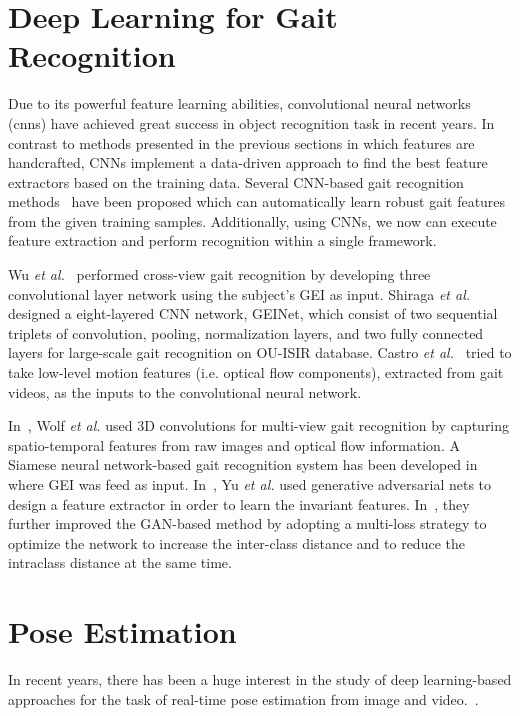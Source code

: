 \section{Deep Learning for Gait Recognition} \label{sec:deep_learning_gait_rec}
Due to its powerful feature learning abilities, convolutional neural networks (\gls{cnn}s) have achieved great success in object recognition task in recent years. In contrast to methods presented in the previous sections in which features are handcrafted, CNNs implement a data-driven approach to find the best feature extractors based on the training data. Several CNN-based gait recognition methods~\cite{Wu_17, Shiraga_16, Wolf_16, Zhang_16, Yu_17, Yu_19} have been proposed which can automatically learn robust gait features from the given training samples. Additionally, using CNNs, we now can execute feature extraction and perform recognition within a single framework. 

Wu \textit{et al.}~\cite{Wu_17} performed cross-view gait recognition by developing three convolutional layer network using the subject's GEI as input. Shiraga \textit{et al.}~\cite{Shiraga_16} designed a eight-layered CNN network, GEINet, which consist of two sequential triplets of convolution, pooling, normalization layers, and two fully connected layers for large-scale gait recognition on OU-ISIR database. Castro \textit{et al.}~\cite{Castro_17} tried to take low-level motion features (i.e. optical flow components), extracted from gait videos, as the inputs to the convolutional neural network.


In~\cite{Wolf_16}, Wolf \textit{et al.} used 3D convolutions for multi-view gait recognition by capturing spatio-temporal features from raw images and optical flow information. A Siamese neural network-based gait recognition system has been developed in~\cite{Zhang_16} where GEI was feed as input. In~\cite{Yu_17}, Yu \textit{et al.} used generative adversarial nets to design a feature extractor in order to learn the invariant features. In~\cite{Yu_19}, they further improved the GAN-based method by adopting a multi-loss strategy to optimize the network to increase the inter-class distance and to reduce the intraclass distance at the same time.


\section{Pose Estimation} \label{sec:pose_estimation}
In recent years, there has been a huge interest in the study of deep learning-based approaches for the task of real-time pose estimation from image and video.~\cite{Wei_16, Cao_19}.  


